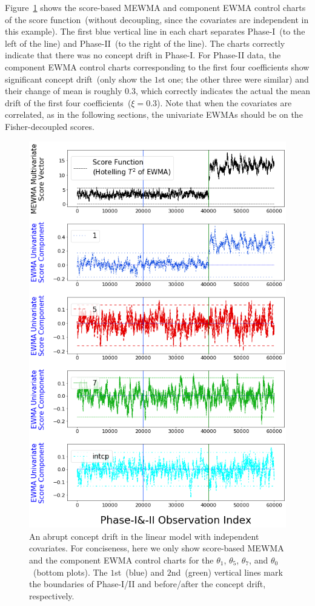 \documentclass[twoside,11pt]{article}
\begin{document}
\begin{appendices}
Figure~\ref{fig:lin_reg_ind_X} shows the score-based MEWMA and component EWMA control charts of the score function~(without decoupling, since the covariates are independent in this example). The first blue vertical line in each chart separates Phase-I~(to the left of the line) and Phase-II~(to the right of the line). The charts correctly indicate that there was no concept drift in Phase-I. For Phase-II data, the component EWMA control charts corresponding to the first four coefficients show significant concept drift~(only show the $1$st one; the other three were similar) and their change of mean is roughly $0.3$, which correctly indicates the actual the mean drift of the first four coefficients~($\xi=0.3$). Note that when the covariates are correlated, as in the following sections, the univariate EWMAs should be on the Fisher-decoupled scores. 


\begin{figure}[!hpt]
\centering
  \includegraphics[width = 0.55\linewidth]{../figures/v14/sim_2/reg/neg_single_1_sim2_mlines_with_regu_1e-08_0_005.png}
  \caption{An abrupt concept drift in the linear model with independent covariates. For conciseness, here we only show score-based MEWMA and the component EWMA control charts for the $\theta_1$, $\theta_5$, $\theta_7$, and $\theta_0$~(bottom plots). The $1$st~(blue) and $2$nd~(green) vertical lines mark the boundaries of Phase-I/II and before/after the concept drift, respectively.}
  \label{fig:lin_reg_ind_X}
\end{figure}


\end{appendices}
\end{document}
